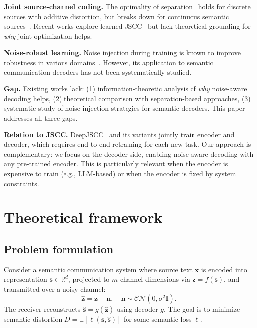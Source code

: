 \documentclass[a4paper,fleqn]{cas-sc}
\begin{document}
\textbf{Joint source-channel coding.} The optimality of separation~\citep{shannon1948mathematical} holds for discrete sources with additive distortion, but breaks down for continuous semantic sources~\citep{xie2021deep}. Recent works explore learned JSCC~\citep{kurka2020deepjssc} but lack theoretical grounding for \emph{why} joint optimization helps.

\textbf{Noise-robust learning.} Noise injection during training is known to improve robustness in various domains~\citep{letaief2022edge}. However, its application to semantic communication decoders has not been systematically studied.

\textbf{Gap.} Existing works lack: (1) information-theoretic analysis of \emph{why} noise-aware decoding helps, (2) theoretical comparison with separation-based approaches, (3) systematic study of noise injection strategies for semantic decoders. This paper addresses all three gaps.

\textbf{Relation to JSCC.} DeepJSCC~\citep{kurka2020deepjssc} and its variants jointly train encoder and decoder, which requires end-to-end retraining for each new task. Our approach is complementary: we focus on the decoder side, enabling noise-aware decoding with any pre-trained encoder. This is particularly relevant when the encoder is expensive to train (e.g., LLM-based) or when the encoder is fixed by system constraints.


\section{Theoretical framework}\label{sec:theory}

\subsection{Problem formulation}

Consider a semantic communication system where source text $\mathbf{x}$ is encoded into representation $\mathbf{s} \in \mathbb{R}^d$, projected to $m$ channel dimensions via $\mathbf{z} = f(\mathbf{s})$, and transmitted over a noisy channel:
\begin{equation}\label{eq:channel}
\hat{\mathbf{z}} = \mathbf{z} + \mathbf{n}, \quad \mathbf{n} \sim \mathcal{CN}(0, \sigma^2 \mathbf{I}).
\end{equation}
The receiver reconstructs $\hat{\mathbf{s}} = g(\hat{\mathbf{z}})$ using decoder $g$. The goal is to minimize semantic distortion $D = \mathbb{E}[\ell(\mathbf{s}, \hat{\mathbf{s}})]$ for some semantic loss $\ell$.
\end{document}
